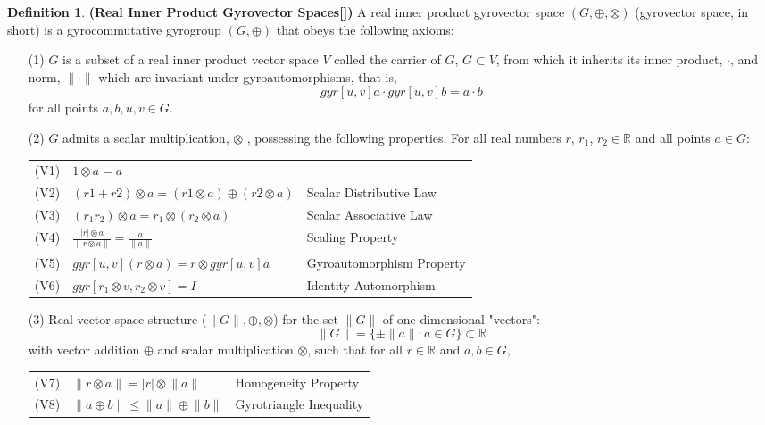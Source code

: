 \documentclass[a4paper]{article}
\theoremstyle{definition}
\newtheorem{definition}{Definition}[section]
\begin{document}
\begin{definition} \textbf{(Real Inner Product Gyrovector Spaces[])} A real
inner product gyrovector space $(G, \oplus, \otimes )$ (gyrovector space, in short) is a gyrocommutative gyrogroup $(G, \oplus)$ that obeys the following axioms:
\begin{itemize}
\item[(1)]  $G$ is a subset of a real inner product vector space $V$ called the carrier of $G$, $G \subset V$, from which it inherits its inner product, $\cdot$, and norm, $\lVert \cdot \rVert$ which are invariant under gyroautomorphisms, that is, $$gyr[u, v ] a \cdot gyr [ u , v]b = a \cdot b$$
for all points $a, b, u, v \in G$.
\item[(2)] $G$ admits a scalar multiplication, $\otimes$ , possessing the following properties. For all real numbers $r$, $r_1$, $r_2 \in \mathbb{R}$  and all points $a \in G$:\\[2mm]
\begin{tabular}{cll}
(V1) & $1\otimes a = a$ & \\[1mm]
(V2) & $(r1 + r2) \otimes a = (r1 \otimes a) \oplus (r2 \otimes a)$ & Scalar Distributive Law\\[1mm]
(V3) & $(r_1r_2)\otimes a = r_1 \otimes (r_2 \otimes a)$ & Scalar Associative Law\\[1mm]
(V4) & $\frac{|r|\otimes a}{\lVert r \otimes a \rVert} = \frac{a}{\lVert a \rVert}$ & Scaling Property\\[1mm]
(V5) & $gyr[u,v](r\otimes a) = r \otimes gyr[u,v]a$ & Gyroautomorphism Property\\[1mm]
(V6) & $gyr[r_1\otimes v, r_2 \otimes v] = I$ & Identity Automorphism\\
\end{tabular}

\item[(3)] Real vector space structure ($\lVert G \rVert, \oplus, \otimes$) for the set $\lVert G \rVert$ of one-dimensional "vectors":
$$\lVert G \rVert = \{\pm \lVert a \rVert:a\in G\}\subset\mathbb{R}$$
with vector addition $\oplus$ and scalar multiplication $\otimes$, such that for all $r\in \mathbb{R}$ and $a, b \in G$,\\[2mm]
\begin{tabular}{cll}
(V7) & $\lVert r\otimes a \rVert = |r| \otimes \lVert a \rVert$ & Homogeneity Property\\[1mm]
(V8) & $\lVert a \oplus b \rVert \leq \lVert a \rVert \oplus \lVert b \rVert$ & Gyrotriangle Inequality\\ 
\end{tabular}
\end{itemize}
\end{definition}
\end{document}
